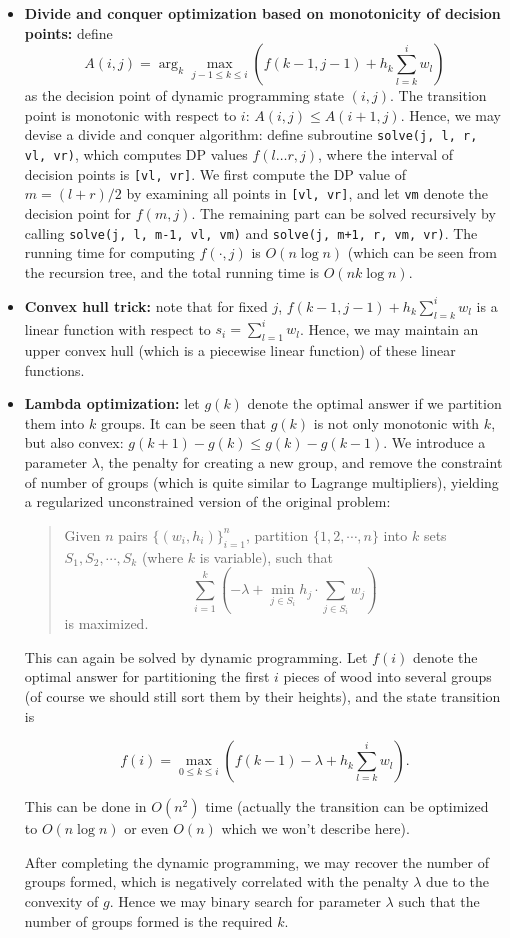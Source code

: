 \documentclass[a4paper,10.5pt,twoside]{article}
\begin{document}
\begin{itemize}
\item \textbf{Divide and conquer optimization based on monotonicity of decision points:} define 
$$A(i, j) = \arg_k\max_{j-1 \leq k \leq i} \left( f(k-1, j-1) + h_{k} \sum_{l = k}^i w_l \right)$$
as the decision point of dynamic programming state $(i, j)$. The transition point is monotonic with respect to $i$: $A(i, j) \leq A(i+1, j)$. Hence, we may devise a divide and conquer algorithm: define subroutine \verb|solve(j, l, r, vl, vr)|, which computes DP values $f(l \ldots r, j)$, where the interval of decision points is \verb|[vl, vr]|. We first compute the DP value of $m = (l+r)/2$ by examining all points in \verb|[vl, vr]|, and let \verb|vm| denote the decision point for $f(m, j)$. The remaining part can be solved recursively by calling \verb|solve(j, l, m-1, vl, vm)| and \verb|solve(j, m+1, r, vm, vr)|. The running time for computing $f(\cdot, j)$ is $O(n \log n)$ (which can be seen from the recursion tree, and the total running time is $O(nk \log n)$.
\item \textbf{Convex hull trick:} note that for fixed $j$, $f(k-1, j-1) + h_{k} \sum_{l = k}^i w_l$ is a linear function with respect to $s_i = \sum_{l = 1}^i w_l$. Hence, we may maintain an upper convex hull (which is a piecewise linear function) of these linear functions.
\item \textbf{Lambda optimization:} let $g(k)$ denote the optimal answer if we partition them into $k$ groups. It can be seen that $g(k)$ is not only monotonic with $k$, but also convex: $g(k+1) - g(k) \leq g(k) - g(k-1)$. We introduce a parameter $\lambda$, the penalty for creating a new group, and remove the constraint of number of groups (which is quite similar to Lagrange multipliers), yielding a regularized unconstrained version of the original problem:

\begin{quote}
Given $n$ pairs $\{(w_i, h_i)\}_{i=1}^n$, partition $\{1, 2, \cdots, n\}$ into $k$ sets $S_1, S_2, \cdots, S_k$ (where $k$ is variable), such that 
$$ \sum_{i=1}^k \left(-\lambda + \min_{j \in S_i} h_j \cdot \sum_{j \in S_i} w_j\right)$$
is maximized.
\end{quote}

This can again be solved by dynamic programming. Let $f(i)$ denote the optimal answer for partitioning the first $i$ pieces of wood into several groups (of course we should still sort them by their heights), and the state transition is

$$ f(i) = \max_{0 \leq k \leq i} \left(f(k-1) - \lambda  + h_{k} \sum_{l = k}^i w_l \right). $$

This can be done in $O(n^2)$ time (actually the transition can be optimized to $O(n \log n)$ or even $O(n)$ which we won't describe here).

After completing the dynamic programming, we may recover the number of groups formed, which is negatively correlated with the penalty $\lambda$ due to the convexity of $g$. Hence we may binary search for parameter $\lambda$ such that the number of groups formed is the required $k$.
\end{itemize}
\end{document}
